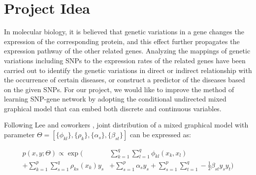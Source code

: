 \documentclass{article}
\begin{document}
 


\section{Project Idea}

In molecular biology, it is believed that genetic variations in a gene changes the expression of the corresponding protein, and this effect further propagates the expression pathway of the other related genes. Analyzing the mappings of genetic variations including SNPs to the expression rates of the related genes have been carried out to identify the genetic variations in direct or indirect relationship with the occurrence of certain diseases, or construct a predictor of the diseases based on the given SNPs. For our project, we would like to improve the method of learning SNP-gene network by adopting the conditional undirected mixed graphical model that can embed both discrete and continuous variables.

Following Lee and coworkers \cite{lee2013structure}, joint distribution of a mixed graphical model with parameter $\Theta = [\{\phi_{kl}\}, \{\rho_{k}\}, \{\alpha_{s}\}, \{\beta_{st}\}]$ can be expressed as:

\begin{align}
p(x, y ; \Theta) \propto \exp \Big( &\sum_{k=1}^{q} \sum_{l=1}^{q} \phi_{kl} (x_k, x_l) \nonumber \\
+ \sum_{k=1}^{p} \sum_{s=1}^{q} \rho_{ks}(x_k) y_s  &+ \sum_{s=1}^{p} \alpha_s y_s + \sum_{s=1}^{p} \sum_{t=1}^{q} -\frac{1}{2} \beta_{st} y_s y_t \Big)
\end{align} 
\end{document}
